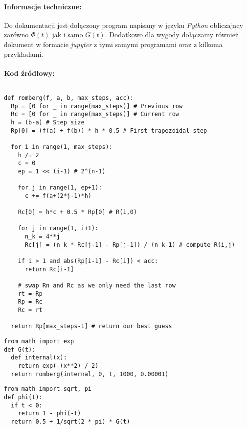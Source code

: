 \documentclass[12pt,oneside,a4paper]{article}
\begin{document}
\paragraph{Informacje techniczne:\\}
Do dokumentacji jest dołączony program napisany w języku \textit{Python} obliczający zarówno $\Phi(t)$ jak i samo $G(t)$. Dodatkowo dla wygody dołączamy również dokument w formacie \textit{jupyter} z tymi samymi programami oraz z kilkoma przykładami.



\paragraph{Kod źródłowy:}
$ $
\begin{lstlisting}[title={Metoda Romberga}]
def romberg(f, a, b, max_steps, acc):
  Rp = [0 for _ in range(max_steps)] # Previous row
  Rc = [0 for _ in range(max_steps)] # Current row
  h = (b-a) # Step size
  Rp[0] = (f(a) + f(b)) * h * 0.5 # First trapezoidal step

  for i in range(1, max_steps):
    h /= 2
    c = 0
    ep = 1 << (i-1) # 2^(n-1)

    for j in range(1, ep+1):
      c += f(a+(2*j-1)*h)

    Rc[0] = h*c + 0.5 * Rp[0] # R(i,0)

    for j in range(1, i+1):
      n_k = 4**j
      Rc[j] = (n_k * Rc[j-1] - Rp[j-1]) / (n_k-1) # compute R(i,j)

    if i > 1 and abs(Rp[i-1] - Rc[i]) < acc:
      return Rc[i-1]

    # swap Rn and Rc as we only need the last row
    rt = Rp
    Rp = Rc
    Rc = rt

  return Rp[max_steps-1] # return our best guess
\end{lstlisting}

\newpage

\begin{lstlisting}[title={Definicja funkcji $G(t)$}]
from math import exp
def G(t):
  def internal(x):
    return exp(-(x**2) / 2)
  return romberg(internal, 0, t, 1000, 0.00001)
\end{lstlisting}

\begin{lstlisting}[title={Definicja funkcji $\Phi(t)$}]
from math import sqrt, pi
def phi(t):
  if t < 0:
    return 1 - phi(-t)
  return 0.5 + 1/sqrt(2 * pi) * G(t)
\end{lstlisting}
\end{document}
